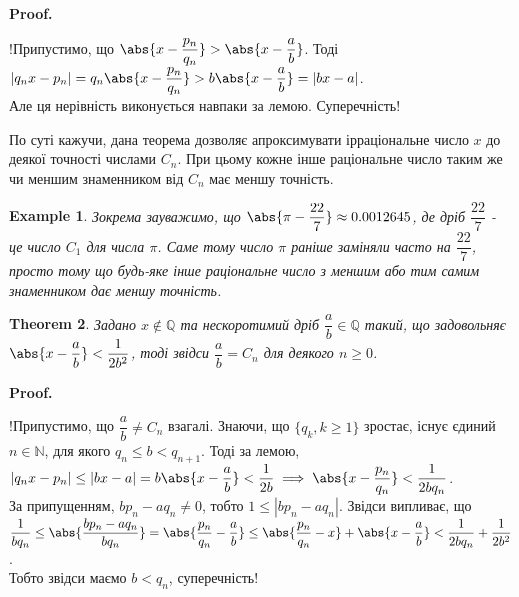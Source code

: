 \documentclass[a4paper, 14pt]{extarticle}
\makeatletter
\theoremstyle{theoremdd}
\newtheorem{theorem}{Theorem}[subsection]
\theoremstyle{theoremdd}
\theoremstyle{theoremdd}
\theoremstyle{theoremdd}
\newtheorem{example}[theorem]{Example}
\theoremstyle{theoremdd}
\theoremstyle{theoremdd}
\theoremstyle{theoremdd}
\theoremstyle{theoremdd}
\def\qed{$\blacksquare$}
\renewenvironment{proof}[1][Proof.\\]{\par
\pushQED{\hfill \qed}%
\normalfont \topsep6\p@\@plus6\p@\relax
\trivlist
\item\relax
{\bfseries
#1\@addpunct{.}}\hspace\labelsep\ignorespaces
}{%
\popQED\endtrivlist\@endpefalse
}
\makeatother
\begin{document}
\begin{proof}
!Припустимо, що $\abs{x - \dfrac{p_n}{q_n}} > \abs{x - \dfrac{a}{b}}$. Тоді\\
$|q_n x - p_n| = q_n \abs{x - \dfrac{p_n}{q_n}} > b \abs{x - \dfrac{a}{b}} = |bx-a|$.\\
Але ця нерівність виконується навпаки за лемою. Суперечність!
\end{proof}

По суті кажучи, дана теорема дозволяє апроксимувати ірраціональне число $x$ до деякої точності числами $C_n$. При цьому кожне інше раціональне число таким же чи меншим знаменником від $C_n$ має меншу точність.

\begin{example}
Зокрема зауважимо, що $\abs{\pi - \dfrac{22}{7}} \approx 0.0012645$, де дріб $\dfrac{22}{7}$ - це число $C_1$ для числа $\pi$. Саме тому число $\pi$ раніше заміняли часто на $\dfrac{22}{7}$, просто тому що будь-яке інше раціональне число з меншим або тим самим знаменником дає меншу точність.
\end{example}

\begin{theorem}
\label{rational is convergent if estimation holds}
Задано $x \not\in \mathbb{Q}$ та нескоротимий дріб $\dfrac{a}{b} \in \mathbb{Q}$ такий, що задовольняє $\abs{x - \dfrac{a}{b}} < \dfrac{1}{2b^2}$, тоді звідси $\dfrac{a}{b} = C_n$ для деякого $n \geq 0$.
\end{theorem}

\begin{proof}
!Припустимо, що $\dfrac{a}{b} \neq C_n$ взагалі. Знаючи, що $\{q_k, k \geq 1\}$ зростає, існує єдиний $n \in \mathbb{N}$, для якого $q_n \leq b < q_{n+1}$. Тоді за лемою,\\
$|q_n x - p_n| \leq |bx - a| = b \abs{x - \dfrac{a}{b}} < \dfrac{1}{2b} \implies \abs{x - \dfrac{p_n}{q_n}} < \dfrac{1}{2bq_n}$.\\
За припущенням, $bp_n - aq_n \neq 0$, тобто $1 \leq |bp_n - aq_n|$. Звідси випливає, що\\
$\dfrac{1}{bq_n} \leq \abs{\dfrac{bp_n - aq_n}{bq_n}} = \abs{\dfrac{p_n}{q_n} - \dfrac{a}{b}} \leq \abs{\dfrac{p_n}{q_n} - x} + \abs{x - \dfrac{a}{b}} < \dfrac{1}{2bq_n} + \dfrac{1}{2b^2}$.\\
Тобто звідси маємо $b < q_n$, суперечність! 
\end{proof}
\end{document}
